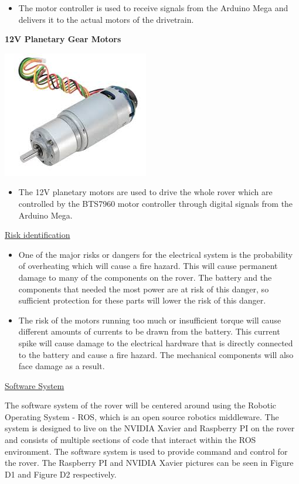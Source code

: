 \documentclass[a4paper, 10pt]{article}
\begin{document}
\begin{itemize}
\item
	The motor controller is used to receive signals from the Arduino Mega and delivers it to the actual motors of the drivetrain.
\end{itemize}

\textbf{12V Planetary Gear Motors}

\includegraphics[scale=0.5]{Gear motor 12V planetary}

\begin{itemize}
\item
	The 12V planetary motors are used to drive the whole rover which are controlled by the BTS7960 motor controller through digital signals from the Arduino Mega.
\end{itemize}

\underline{Risk identification}

\begin{itemize}
\item
	One of the major risks or dangers for the electrical system is the probability of overheating which will cause a fire hazard. This will cause permanent damage to many of the components on the rover. The battery and the components that needed the most power are at risk of this danger, so sufficient protection for these parts will lower the risk of this danger.

\item
	The risk of the motors running too much or insufficient torque will cause different amounts of currents to be drawn from the battery. This current spike will cause damage to the electrical hardware that is directly connected to the battery and cause a fire hazard. The mechanical components will also face damage as a result.
\end{itemize}

\underline{Software System}

The software system of the rover will be centered around using the Robotic Operating System - ROS, which is an open source robotics middleware. The system is designed to live on the NVIDIA Xavier and Raspberry PI on the rover and consists of multiple sections of code that interact within the ROS environment. The software system is used to provide command and control for the rover. The Raspberry PI and NVIDIA Xavier pictures can be seen in Figure D1 and Figure D2 respectively. \\
\end{document}
